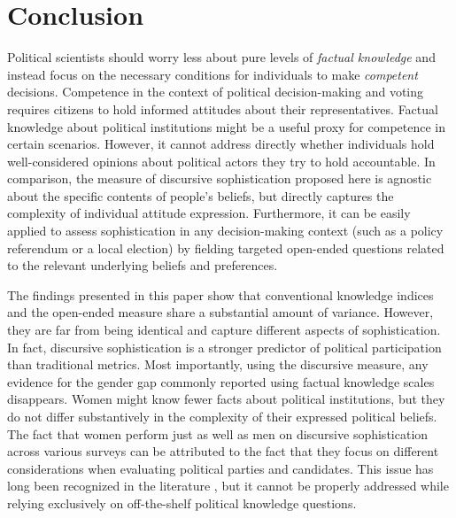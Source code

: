 

\section*{Conclusion}

Political scientists should worry less about pure levels of \textit{factual knowledge} and instead focus on the necessary conditions for individuals to make \textit{competent} decisions. Competence in the context of political decision-making and voting requires citizens to hold informed attitudes about their representatives. Factual knowledge about political institutions might be a useful proxy for competence in certain scenarios. However, it cannot address directly whether individuals hold well-considered opinions about political actors they try to hold accountable. In comparison, the measure of discursive sophistication proposed here is agnostic about the specific contents of people's beliefs, but directly captures the complexity of individual attitude expression. Furthermore, it can be easily applied to assess sophistication in any decision-making context (such as a policy referendum or a local election) by fielding targeted open-ended questions related to the relevant underlying beliefs and preferences.

The findings presented in this paper show that conventional knowledge indices and the open-ended measure share a substantial amount of variance. However, they are far from being identical and capture different aspects of sophistication. In fact, discursive sophistication is a stronger predictor of political participation than traditional metrics. Most importantly, using the discursive measure, any evidence for the gender gap commonly reported using factual knowledge scales disappears. Women might know fewer facts about political institutions, but they do not differ substantively in the complexity of their expressed political beliefs. The fact that women perform just as well as men on discursive sophistication across various surveys can be attributed to the fact that they focus on different considerations when evaluating political parties and candidates. This issue has long been recognized in the literature \citep[e.g.,][]{graber2001processing,dolan2011women}, but it cannot be properly addressed while relying exclusively on off-the-shelf political knowledge questions.

